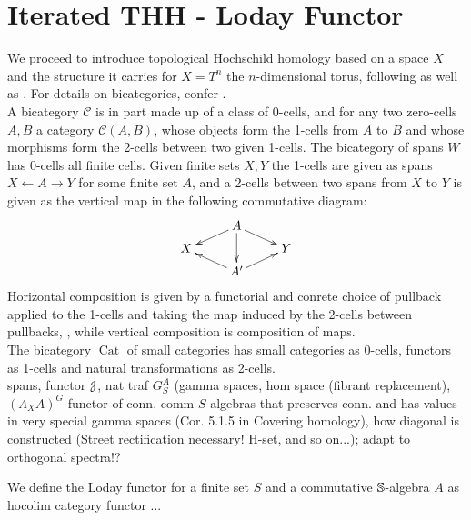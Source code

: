 \section{Iterated THH - Loday Functor}
We proceed to introduce topological Hochschild homology based on a space $X$ and the structure it carries for $X = T^n$ the $n$-dimensional torus, following \cite{brun2010covering} as well as \cite{carlsson2011higher}. For details on bicategories, confer \cite{benabou1967introduction}.\\
A bicategory $\mathcal{C}$ is in part made up of a class of 0-cells, and for any two zero-cells $A,B$ a category $\mathcal{C}(A,B)$, whose objects form the 1-cells from $A$ to $B$ and whose morphisms form the 2-cells between two given 1-cells. The bicategory of spans $W$ has 0-cells all finite cells. Given finite sets $X,Y$ the 1-cells are given as spans $ X \leftarrow A \rightarrow Y$ for some finite set $A$, and a 2-cells between two spans from $X$ to $Y$  is given as the vertical map in the following commutative diagram:
\[
\xymatrix@R-=.5em{
  &
  A \ar[dl] \ar[dd] \ar[dr]
  \\
  X
  &
  &
  Y
  \\
  &
  A^\prime \ar[ul] \ar[ur]
  &
}
\]
Horizontal composition is given by a functorial and conrete choice of pullback applied to the 1-cells and taking the map induced by the 2-cells between pullbacks, , while vertical composition is composition of maps.\\
The bicategory $\operatorname{Cat}$ of small categories has small categories as 0-cells, functors as 1-cells and natural transformations as 2-cells.
\\
spans, functor $\mathcal{J}$, nat traf $G^A_S$ (gamma spaces, hom space (fibrant replacement), $(\Lambda_X A)^G$ functor of conn. comm $S$-algebras that preserves conn. and has values in very special gamma spaces (Cor. 5.1.5 in Covering homology), how diagonal is constructed (Street rectification necessary! H-set, and so on...); adapt to orthogonal spectra!?
\begin{defn}\label{def_loday_functor}
We define the Loday functor for a finite set $S$ and a commutative $\mathbb{S}$-algebra $A$ as hocolim category functor ...
\end{defn}
